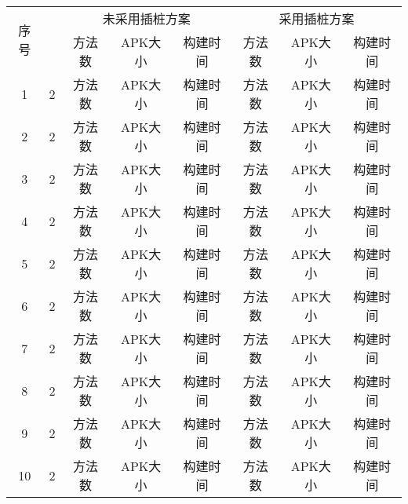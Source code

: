 {\begin{table*}[!ht]
{\begin{threeparttable}[b]
			\begin{tabular}{|c|c|c|c|c|c|c|c|}
				\hline
				
				\multirow{2}{0.03\linewidth}{序号}	&\multirow{2}{0.2\linewidth}{\centering{应用名}}& \multicolumn{3}{c}{未采用插桩方案}&  \multicolumn{3}{|c|}{采用插桩方案 }\\
				\cline{3-8}
				
				&	& 方法数 & APK大小 &	构建时间 &方法数 & APK大小 & 构建时间\\
				\hline
				
				1&	2   &方法数 & APK大小 &	构建时间 & 方法数 & APK大小 & 构建时间\\
				\hline
				2&	2   &方法数 & APK大小 &	构建时间 & 方法数 & APK大小 & 构建时间\\
				\hline
				3&	2    &方法数 & APK大小 &	构建时间 & 方法数 & APK大小 & 构建时间\\
				\hline
				4&	2    &方法数 & APK大小 &	构建时间 & 方法数 & APK大小 & 构建时间\\
				\hline
				5&	2    &方法数 & APK大小 &	构建时间 & 方法数 & APK大小 & 构建时间\\
				\hline		
				6&	2    &方法数 & APK大小 &	构建时间 & 方法数 & APK大小 & 构建时间\\
				\hline			
				7&	2    &方法数 & APK大小 &	构建时间 & 方法数 & APK大小 & 构建时间\\
				\hline		
				8&	2   &方法数 & APK大小 &	构建时间 & 方法数 & APK大小 & 构建时间\\
				\hline	
				9&	2   &方法数 & APK大小 &	构建时间 & 方法数 & APK大小 & 构建时间\\
				\hline	
				10&	2   &方法数 & APK大小 &	构建时间 & 方法数 & APK大小 & 构建时间\\
				\hline
				
				
				
			\end{tabular}
			
			
		\end{threeparttable}
	}
\end{table*}


}

